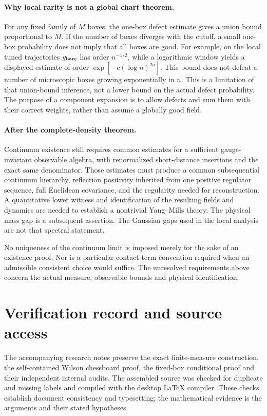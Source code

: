 \paragraph{Why local rarity is not a global chart theorem.}
For any fixed family of \(M\) boxes, the one-box defect estimate
gives a union bound proportional to \(M\). If the number of boxes
diverges with the cutoff, a small one-box probability does not
imply that all boxes are good. For example, on the local tuned
trajectories \(g_{\rm bare}\) has order \(n^{-1/2}\), while a
logarithmic window yields a displayed estimate of order
\(\exp[-c(\log n)^{2a}]\). This bound does not defeat a number
of microscopic boxes growing exponentially in \(n\). This is
a limitation of that union-bound inference, not a lower bound
on the actual defect probability. The purpose of a component
expansion is to allow defects and sum them with their correct
weights, rather than assume a globally good field.

\paragraph{After the complete-density theorem.}
Continuum existence still requires common estimates for a
sufficient gauge-invariant observable algebra, with renormalized
short-distance insertions and the exact same denominator. Those
estimates must produce a common subsequential continuum hierarchy,
reflection positivity inherited from one positive regulator
sequence, full Euclidean covariance, and the regularity needed
for reconstruction. A quantitative lower witness and
identification of the resulting fields and dynamics are needed
to establish a nontrivial Yang--Mills theory. The physical mass
gap is a subsequent assertion. The Gaussian gaps used in the
local analysis are not that spectral statement.

No uniqueness of the continuum limit is imposed merely for the
sake of an existence proof. Nor is a particular contact-term
convention required when an admissible consistent choice would
suffice. The unresolved requirements above concern the actual
measure, observable bounds and physical identification.

\section*{Verification record and source access}

The accompanying research notes preserve the exact finite-measure
construction, the self-contained Wilson chessboard proof, the
fixed-box conditional proof and their independent internal audits.
The assembled source was checked for duplicate and missing labels
and compiled with the desktop LaTeX compiler. These checks establish
document consistency and typesetting; the mathematical evidence is
the arguments and their stated hypotheses.

